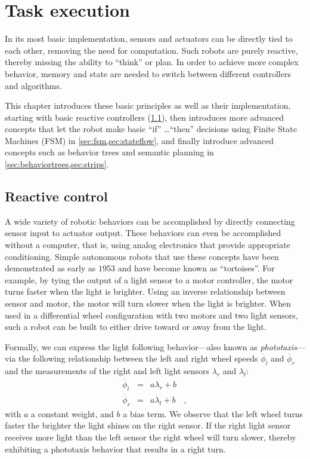 \chapter{Task execution}\label{chap:taskexecution}

In its most basic implementation, sensors and actuators can be directly tied to each other, removing the need for computation. Such robots are purely reactive, thereby missing the ability to ``think'' or plan. In order to achieve more complex behavior, memory and state are needed to switch between different controllers and algorithms.

This chapter introduces these basic principles as well as their implementation, starting with basic reactive controllers (\cref{sec:braitenberg}), then introduces more advanced concepts that let the robot make basic ``if'' \ldots ``then'' decisions using Finite State Machines (FSM) in \cref{sec:fsm,sec:stateflow}, and finally introduce advanced concepts such as behavior trees and semantic planning in \cref{sec:behaviortrees,sec:strips}.

\section{Reactive control}\label{sec:braitenberg}

A wide variety of robotic behaviors can be accomplished by directly connecting sensor input to actuator output. These behaviors can even be accomplished without a computer, that is, using analog electronics that provide appropriate conditioning.
Simple autonomous robots that use these concepts have been demonstrated as early as $1953$ \cite{walter1953living} and have become known as ``tortoises''. For example, by tying the output of a light sensor to a motor controller, the motor turns faster when the light is brighter. Using an inverse relationship between sensor and motor, the motor will turn slower when the light is brighter. When used in a differential wheel configuration with two motors and two light sensors, such a robot can be built to either drive toward or away from the light.

Formally, we can express the light following behavior---also known as \textsl{phototaxis}---via the following relationship between
the left and right wheel speeds $\dot{\phi_l}$ and $\dot{\phi_r}$ and the measurements of the right and left light sensors $\lambda_r$ and $\lambda_l$:
\begin{eqnarray}\label{eq:simplereactive}
\dot{\phi_l}&=&a \lambda_r + b\quad \\
\dot{\phi_r}&=&a \lambda_l + b\quad,
\end{eqnarray}
with $a$ a constant weight, and $b$ a bias term. We observe that the left wheel turns faster the brighter the light shines on the right sensor. If the right light sensor receives more light than the left sensor the right wheel will turn slower, thereby exhibiting a phototaxis behavior that results in a right turn.

